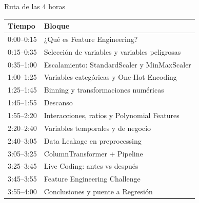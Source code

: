 \documentclass[aspectratio=169,11pt]{beamer}
\begin{document}

\begin{frame}{Ruta de las 4 horas}

\scriptsize

\begin{table}
\centering

\begin{tabular}{p{2cm}p{9cm}}
\toprule
\textbf{Tiempo} & \textbf{Bloque} \\
\midrule

0:00--0:15 &
¿Qué es Feature Engineering? \\

0:15--0:35 &
Selección de variables y variables peligrosas \\

0:35--1:00 &
Escalamiento: StandardScaler y MinMaxScaler \\

1:00--1:25 &
Variables categóricas y One-Hot Encoding \\

1:25--1:45 &
Binning y transformaciones numéricas \\

1:45--1:55 &
Descanso \\

1:55--2:20 &
Interacciones, ratios y Polynomial Features \\

2:20--2:40 &
Variables temporales y de negocio \\

2:40--3:05 &
Data Leakage en preprocessing \\

3:05--3:25 &
ColumnTransformer + Pipeline \\

3:25--3:45 &
Live Coding: antes vs después \\

3:45--3:55 &
Feature Engineering Challenge \\

3:55--4:00 &
Conclusiones y puente a Regresión \\

\bottomrule
\end{tabular}

\end{table}

\end{frame}
\end{document}
